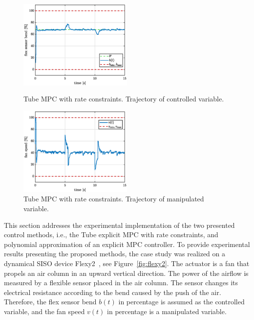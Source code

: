 \documentclass[letterpaper, 10 pt, conference]{ieeeconf}
\begin{document}
\begin{figure}[hbp!]
	\begin{center}
		\includegraphics[width=0.5\textwidth]{images/deltaU_b_new.eps}
		\caption{Tube MPC with rate constraints. Trajectory of controlled variable.}
		\label{fig:deltaU_y}
	\end{center}
	\begin{center}
		\includegraphics[width=0.5\textwidth]{images/deltaU_v_new.eps}
		\caption{Tube MPC with rate constraints. Trajectory of manipulated variable.}
		\label{fig:deltaU_u}
	\end{center}
\end{figure}

This section addresses the experimental implementation of the two presented control methods, i.e., the Tube explicit MPC with rate constraints, and polynomial approximation of an explicit MPC controller. To provide experimental results presenting the proposed methods, the case study was realized on a dynamical SISO device Flexy2~\cite{flexy2}, see Figure~\ref{fig:flexy2}. The actuator is a fan that propels an air column in an upward vertical direction. The power of the airflow is measured
by a flexible sensor placed in the air column. The sensor changes its electrical resistance according to the bend caused by the push of the air. Therefore, the flex sensor bend $b(t)$ in percentage is assumed as the controlled variable, and the fan speed $v(t)$ in percentage is a manipulated variable.
\end{document}
